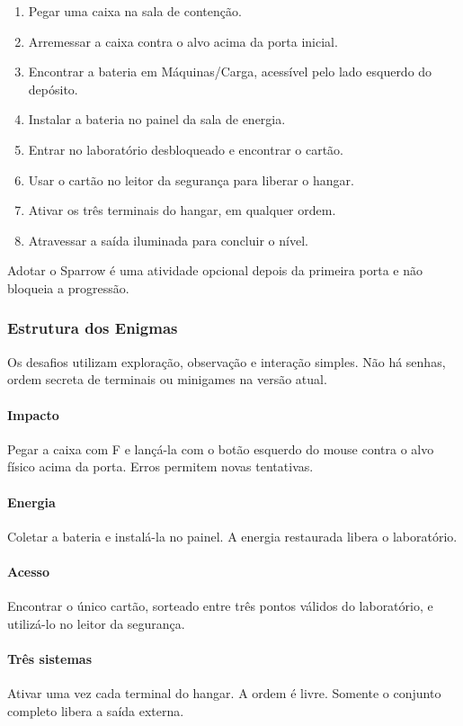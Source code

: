 \documentclass[12pt,a4paper]{article}
\begin{document}
\begin{enumerate}
\item Pegar uma caixa na sala de contenção.
\item Arremessar a caixa contra o alvo acima da porta inicial.
\item Encontrar a bateria em Máquinas/Carga, acessível pelo lado
esquerdo do depósito.
\item Instalar a bateria no painel da sala de energia.
\item Entrar no laboratório desbloqueado e encontrar o cartão.
\item Usar o cartão no leitor da segurança para liberar o hangar.
\item Ativar os três terminais do hangar, em qualquer ordem.
\item Atravessar a saída iluminada para concluir o nível.
\end{enumerate}

Adotar o Sparrow é uma atividade opcional depois da primeira porta
e não bloqueia a progressão.

\subsubsection{Estrutura dos Enigmas}

Os desafios utilizam exploração, observação e interação simples.
Não há senhas, ordem secreta de terminais ou minigames na versão atual.

\paragraph{Impacto} Pegar a caixa com F e lançá-la com o botão esquerdo
do mouse contra o alvo físico acima da porta. Erros permitem novas tentativas.

\paragraph{Energia} Coletar a bateria e instalá-la no painel. A energia
restaurada libera o laboratório.

\paragraph{Acesso} Encontrar o único cartão, sorteado entre três pontos
válidos do laboratório, e utilizá-lo no leitor da segurança.

\paragraph{Três sistemas} Ativar uma vez cada terminal do hangar.
A ordem é livre. Somente o conjunto completo libera a saída externa.
\end{document}
